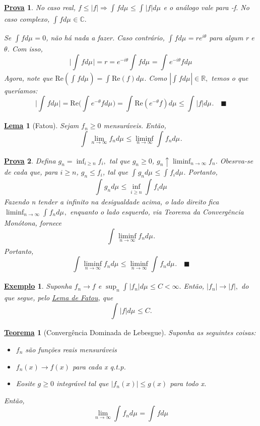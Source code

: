 \documentclass{article}
\newtheorem*{theorem*}{\underline{Teorema}}
\newtheorem*{lemma*}{\underline{Lema}}
\newtheorem{example}{\underline{Exemplo}}
\newtheorem*{proof*}{\underline{Prova}}
\renewcommand\qedsymbol{$\blacksquare$}
\begin{document}
\begin{proof*}
  No caso real, \(f \leq |f| \Rightarrow \int_{}f d\mu_{} \leq \int_{}|f| d\mu_{}\) e o análogo vale para -f. No caso complexo, \(\int_{}f d\mu_{}\in \mathbb{C}.\)

  Se \(\int_{}f d\mu_{} = 0\), não há nada a fazer. Caso contrário, \(\int_{}f d\mu_{} = re^{i\theta }\) para algum r e \(\theta \). Com isso, 
    \[
      \biggl\vert \int_{}f d\mu_{} \biggr\vert = r = e^{-i\theta }\int_{}f d\mu_{} = \int_{}e^{-i\theta }f d\mu_{}
    \]
  Agora, note que \(\mathrm{Re}(\int_{}f d\mu_{}) = \int_{}\mathrm{Re}(f) d\mu_{}.\) Como \(|\int_{}f d\mu_{}|\in \mathbb{R},\) temos o que queríamos: 
    \[
      \biggl\vert \int_{}f d\mu_{}  \biggr\vert = \mathrm{Re}\biggl(\int_{}e^{-\theta }f d\mu_{}\biggr) = \int_{}\mathrm{Re}(e^{-\theta }f) d\mu_{} \leq \int_{}|f| d\mu_{}.\quad \text{\qedsymbol}
    \]
\end{proof*}
\hypertarget{fatou}{ 
  \begin{lemma*}[Fatou]
 Sejam \(f_{n}\geq 0\) mensuráveis. Então, 
   \[
     \int_{}\lim_{n\to \infty}f_{n} d\mu_{} \leq \liminf_{n\to \infty}\int_{}f_{n} d\mu_{}.
   \]
\end{lemma*}}
\begin{proof*}
  Defina \(g_{n} = \inf_{i\geq n}f_{i},\) tal que \(g_{n}\geq 0\),  \(g_{n}\uparrow \liminf_{n\to \infty}f_{n}\). Obesrva-se de cada que, para \(i\geq n\), 
  \(g_{n}\leq f_{i}\), tal que \(\int_{}g_{n} d\mu_{} \leq \int_{}f_{i} d\mu_{}.\) Portanto, 
    \[
      \int_{}g_{n} d\mu_{} \leq \inf_{i\geq n} \int_{}f_{i} d\mu_{}
    \]
  Fazendo n tender a infinito na desigualdade acima, o lado direito fica \(\liminf_{n\to \infty}\int_{}f_{n} d\mu_{},\) enquanto o lado esquerdo, via Teorema da Convergência Monótona, fornece 
    \[
      \int_{}\liminf_{n\to \infty}f_{n} d\mu_{}.
    \]
  Portanto, 
    \[
      \int_{}\liminf_{n\to \infty}f_{n} d\mu_{} \leq \liminf_{n\to \infty}\int_{}f_{n} d\mu_{}.\quad \text{\qedsymbol}
    \]
\end{proof*}
\begin{example}
  Suponha \(f_{n}\longrightarrow f\) e \(\sup_{n}\int_{}|f_{n}| d\mu_{} \leq C < \infty.\) Então, \(|f_{n}|\to |f|,\) do que segue, pelo \hyperlink{fatou}{Lema de Fatou}, que 
    \[
      \int_{}|f| d\mu_{} \leq C.
    \]
\end{example}
 \hypertarget{dominated_convergence}{
   \begin{theorem*}[Convergência Dominada de Lebesgue]
   Suponha as seguintes coisas: 
  \begin{itemize}
    \item \(f_{n}\) são funções reais mensuráveis 
    \item \(f_{n}(x)\to f(x)\) para cada x q.t.p.
    \item Eosite \(g\geq 0\) integrável tal que \(|f_{n}(x)| \leq g(x)\) para todo x.
  \end{itemize}
  Então, 
    \[
      \lim_{n\to \infty}\int_{}f_{n} d\mu_{} = \int_{}f d\mu_{}
    \]
 \end{theorem*}}
\end{document}
